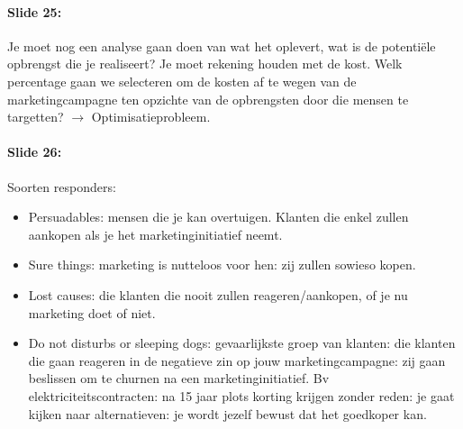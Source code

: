 \documentclass[10pt,a4paper]{report}
\begin{document}
\paragraph{Slide 25:}Je moet nog een analyse gaan doen van wat het oplevert, wat is de potentiële opbrengst die je realiseert? Je moet rekening houden met de kost. Welk percentage gaan we selecteren om de kosten af te wegen van de marketingcampagne ten opzichte van de opbrengsten door die mensen te targetten? $\rightarrow$ Optimisatieprobleem.

\paragraph{Slide 26:}Soorten responders:
\begin{itemize}
\item Persuadables: mensen die je kan overtuigen. Klanten die enkel zullen aankopen als je het marketinginitiatief neemt.
\item Sure things: marketing is nutteloos voor hen: zij zullen sowieso kopen.
\item Lost causes: die klanten die nooit zullen reageren/aankopen, of je nu marketing doet of niet.
\item Do not disturbs or sleeping dogs: gevaarlijkste groep van klanten: die klanten die gaan reageren in de negatieve zin op jouw marketingcampagne: zij gaan beslissen om te churnen na een marketinginitiatief. Bv elektriciteitscontracten: na 15 jaar plots korting krijgen zonder reden: je gaat kijken naar alternatieven: je wordt jezelf bewust dat het goedkoper kan.
\end{itemize}
\end{document}
